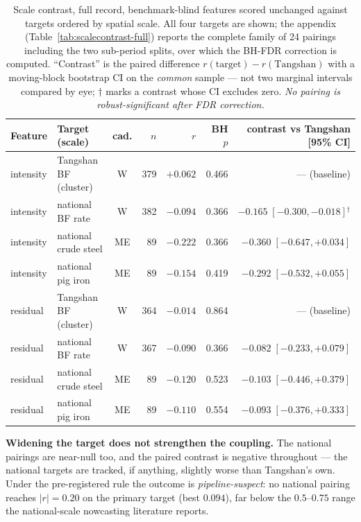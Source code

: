 \documentclass[11pt,a4paper]{article}
\begin{document}
\begin{table}[t]
\centering
\caption{Scale contrast, full record, benchmark-blind features scored unchanged against targets
ordered by spatial scale. All four targets are shown; the appendix (Table~\ref{tab:scalecontrast-full})
reports the complete family of 24 pairings including the two sub-period splits, over which the
BH-FDR correction is computed. ``Contrast'' is the paired difference $r(\text{target}) -
r(\text{Tangshan})$ with a moving-block bootstrap CI on the \emph{common} sample --- not two
marginal intervals compared by eye; $\dagger$ marks a contrast whose CI excludes zero.
\emph{No pairing is robust-significant after FDR correction.}}
\label{tab:scalecontrast}
\small
\begin{tabular}{@{}llcrrrr@{}}
\toprule
Feature & Target (scale) & cad. & $n$ & $r$ & BH $p$ & contrast vs Tangshan [95\% CI] \\
\midrule
intensity & Tangshan BF (cluster) & W & 379 & $+0.062$ & 0.466 & --- (baseline) \\
intensity & national BF rate & W & 382 & $-0.094$ & 0.366 & $-0.165\;[-0.300,-0.018]$$^{\dagger}$ \\
intensity & national crude steel & ME & 89 & $-0.222$ & 0.366 & $-0.360\;[-0.647,+0.034]$ \\
intensity & national pig iron & ME & 89 & $-0.154$ & 0.419 & $-0.292\;[-0.532,+0.055]$ \\
\addlinespace
residual & Tangshan BF (cluster) & W & 364 & $-0.014$ & 0.864 & --- (baseline) \\
residual & national BF rate & W & 367 & $-0.090$ & 0.366 & $-0.082\;[-0.233,+0.079]$ \\
residual & national crude steel & ME & 89 & $-0.120$ & 0.523 & $-0.103\;[-0.446,+0.379]$ \\
residual & national pig iron & ME & 89 & $-0.110$ & 0.554 & $-0.093\;[-0.376,+0.333]$ \\
\bottomrule
\end{tabular}
\end{table}

\textbf{Widening the target does not strengthen the coupling.} The national pairings are near-null
too, and the paired contrast is negative throughout --- the national targets are tracked, if
anything, slightly worse than Tangshan's own. Under the pre-registered rule the outcome is
\emph{pipeline-suspect}: no national pairing reaches $|r|=0.20$ on the primary target (best
$0.094$), far below the $0.5$--$0.75$ range the national-scale nowcasting literature reports.
\end{document}
